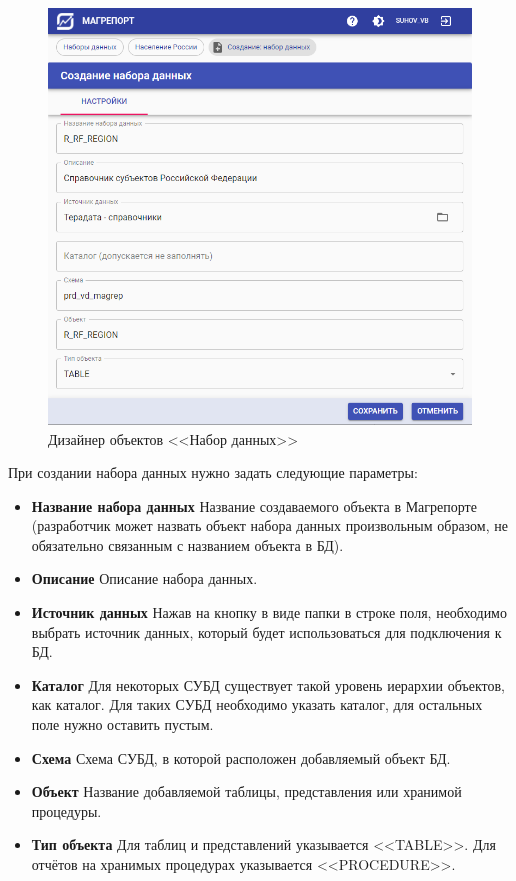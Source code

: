 \documentclass[../user-manual.tex]{subfiles}
\begin{document}
	\begin{figure}[h]
		\centering
		\includegraphics[width=\graphicswidth]{img/3-create-dataset.png}
		\caption{Дизайнер объектов <<Набор данных>>}
		\label{fig:create-dataset}
	\end{figure}

	При создании набора данных нужно задать следующие параметры:
	
	\begin{itemize}
		\item \textbf{Название набора данных} Название создаваемого объекта в Магрепорте (разработчик может назвать объект набора данных произвольным образом, не обязательно связанным с названием объекта в БД).
		
		\item \textbf{Описание} Описание набора данных.
		
		\item \textbf{Источник данных} Нажав на кнопку в виде папки в строке поля, необходимо выбрать  источник данных, который будет использоваться для подключения к БД.
		
		\item \textbf{Каталог} Для некоторых СУБД существует такой уровень иерархии объектов, как каталог. Для таких СУБД необходимо указать каталог, для остальных поле нужно оставить пустым.
		
		\item \textbf{Схема} Схема СУБД, в которой расположен добавляемый объект БД.
		
		\item \textbf{Объект} Название добавляемой таблицы, представления или хранимой процедуры.
		
		\item \textbf{Тип объекта} Для таблиц и представлений указывается <<TABLE>>. Для отчётов на хранимых процедурах указывается <<PROCEDURE>>. 
	
	\end{itemize}
\end{document}
